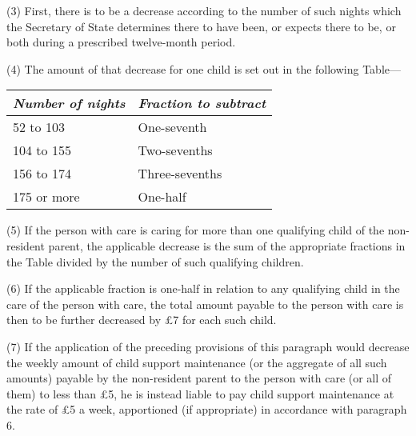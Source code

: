 \documentclass[a4paper]{article}
\begin{document}
{(3) First, there is to be a decrease according to the number of such nights which the Secretary of State determines there to have been, or expects there to be, or both during a prescribed twelve-month period.

(4) The amount of that decrease for one child is set out in the following Table---

\begin{center}
\begin{tabular}{ll}
\hline
\itshape Number of nights & \itshape Fraction to subtract\\
\hline
52 to 103 &One-seventh\\
104 to 155 &Two-sevenths\\
156 to 174 &Three-sevenths\\
175 or more &One-half\\
\hline
\end{tabular}
\end{center}

(5)
If the person with care is caring for more than one qualifying child of the non-resident parent, the applicable decrease is the sum of the appropriate fractions in the Table divided by the number of such qualifying children.

(6)
If the applicable fraction is one-half in relation to any qualifying child in the care of the person with care, the total amount payable to the person with care is then to be further decreased by £7 for each such child.

(7)
If the application of the preceding provisions of this paragraph would decrease the weekly amount of child support maintenance (or the aggregate of all such amounts) payable by the non-resident parent to the person with care (or all of them) to less than £5, he is instead liable to pay child support maintenance at the rate of £5 a week, apportioned (if appropriate) in accordance with paragraph 6.

}
\end{document}
